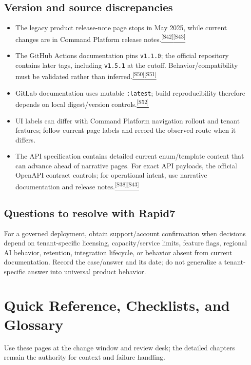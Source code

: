 \documentclass[11pt,letterpaper,oneside]{scrreprt}
\newcommand{\src}[1]{\hyperref[src:#1]{\textsuperscript{\color{R7Orange}[#1]}}}
\newcommand{\code}[1]{\texttt{#1}}
\newcommand{\chapterlead}[1]{\begin{tcolorbox}[enhanced,colback=R7Light,colframe=R7Light,boxrule=0pt,borderline west={3pt}{0pt}{R7Orange},arc=0pt,left=9pt,right=9pt,top=7pt,bottom=7pt]#1\end{tcolorbox}}
\begin{document}
\section{Version and source discrepancies}
\begin{itemize}
  \item The legacy product release-note page stops in May 2025, while current changes are in Command Platform release notes.\src{S42}\src{S43}
  \item The GitHub Actions documentation pins \code{v1.1.0}; the official repository contains later tags, including \code{v1.5.1} at the cutoff. Behavior/compatibility must be validated rather than inferred.\src{S50}\src{S51}
  \item GitLab documentation uses mutable \code{:latest}; build reproducibility therefore depends on local digest/version controls.\src{S52}
  \item UI labels can differ with Command Platform navigation rollout and tenant features; follow current page labels and record the observed route when it differs.
  \item The API specification contains detailed current enum/template content that can advance ahead of narrative pages. For exact API payloads, the official OpenAPI contract controls; for operational intent, use narrative documentation and release notes.\src{S38}\src{S43}
\end{itemize}

\section{Questions to resolve with Rapid7}
For a governed deployment, obtain support/account confirmation when decisions depend on tenant-specific licensing, capacity/service limits, feature flags, regional AI behavior, retention, integration lifecycle, or behavior absent from current documentation. Record the case/answer and its date; do not generalize a tenant-specific answer into universal product behavior.

\chapter{Quick Reference, Checklists, and Glossary}
\chapterlead{Use these pages at the change window and review desk; the detailed chapters remain the authority for context and failure handling.}
\end{document}
